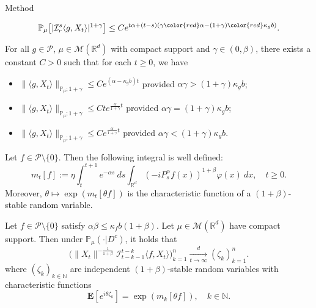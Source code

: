\documentclass[9pt]{beamer}
\begin{document}
\begin{frame}[allowframebreaks]{Method}
\begin{lemma}
\[
    \mathbb P_\mu\big[|\mathcal I_r^s\langle g, X_t\rangle|^{1+\gamma}\big]
    \leq C e^{t\alpha+(t-s) (\gamma{\color{red}\alpha}- (1+\gamma){\color{red}\kappa_g b})}.
\]
\end{lemma}
\begin{lemma}
    For all $g \in \mathcal P$, $\mu \in \mathcal M(\mathbb R^d)$ with compact support and $\gamma\in (0, \beta)$, there exists a constant $C > 0$ such that for each $t\geq 0$, we have
\begin{itemize}
\item
    $\|\langle g,X_t\rangle\|_{\mathbb{P}_{\mu};1+\gamma}\leq C e^{(\alpha-\kappa_g b)t}$ provided {\color{red}$\alpha\gamma >  (1+\gamma)\kappa_gb$};
\item
    $\|\langle g,X_t\rangle\|_{\mathbb{P}_{\mu};1+\gamma}\leq C te^{\frac{\alpha}{1+\gamma}t}$ provided {\color{red}$\alpha\gamma = (1+\gamma)\kappa_gb$};
\item
    $\|\langle g,X_t\rangle\|_{\mathbb{P}_{\mu};1+\gamma}\leq C e^{\frac{\alpha}{1+\gamma}t}$ provided {\color{red}$\alpha\gamma < (1+\gamma)\kappa_g b$}.
\end{itemize}
\end{lemma}
\begin{lemma}
	Let $f\in \mathcal{P}\setminus\{0\}$.
	Then the following integral is well defined:
\begin{equation}
    m_t[f]
    := \eta \int_t^{t+1}e^{-\alpha s}~ds\int_{\mathbb R^d} (-iP_{s}^\alpha f(x))^{1+\beta} \varphi(x)~dx,
    \quad t\geq 0.
\end{equation}
	Moreover, $\theta \mapsto \exp( m_t[\theta f])$ is the characteristic function of a $(1+\beta)$-stable random variable.
\end{lemma}
\begin{theorem}
\label{thm: small clt}
    Let $f\in \mathcal{P}\setminus\{0\}$ satisfy $\alpha\beta\leq \kappa_f b(1+\beta)$.
    Let $\mu\in \mathcal M(\mathbb R^d)$ have compact support. Then under $\mathbb{P}_{\mu}(\cdot|D^c)$, it holds that
\[
    \big(\|X_t\|^{-\frac{1}{1+\beta}}\mathcal I^{t-k}_{t-k-1}\langle f,X_t\rangle\big)_{k=1}^n
    \xrightarrow [t\to \infty]{d} (\zeta_k)_{k=1}^n.
\]
    where $(\zeta_k)_{k \in \mathbb N}$ are independent $(1+\beta)$-stable random variables with characteristic functions
\[
     \mathbf E[e^{i\theta \zeta_k}] = \exp( m_k[\theta f]),\quad k \in \mathbb N.
\]
\end{theorem}
\begin{itemize}

\end{itemize}
\end{frame}
\end{document}
